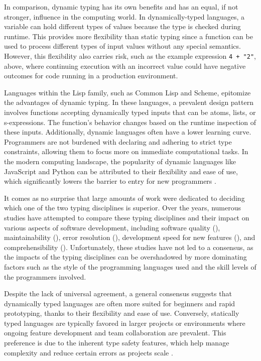 In comparison, dynamic typing has its own benefits and has an equal, if not stronger, influence in the computing world. In dynamically-typed languages, a variable can hold different types of values because the type is checked during runtime. This provides more flexibility than static typing since a function can be used to process different types of input values without any special semantics. However, this flexibility also carries risk, such as the example expression \texttt{4 + "2"}, above, where continuing execution with an incorrect value could have negative outcomes for code running in a production environment.

Languages within the Lisp family, such as Common Lisp and Scheme, epitomize the advantages of dynamic typing. In these languages, a prevalent design pattern involves functions accepting dynamically typed inputs that can be atoms, lists, or s-expressions. The function's behavior changes based on the runtime inspection of these inputs. Additionally, dynamic languages often have a lower learning curve. Programmers are not burdened with declaring and adhering to strict type constraints, allowing them to focus more on immediate computational tasks. In the modern computing landscape, the popularity of dynamic languages like JavaScript and Python can be attributed to their flexibility and ease of use, which significantly lowers the barrier to entry for new programmers \cite{Chatley2019-uq}.


It comes as no surprise that large amounts of work were dedicated to deciding which one of the two typing disciplines is superior. Over the years, numerous studies have attempted to compare these typing disciplines and their impact on various aspects of software development, including software quality (\cite{Ray2017-gq, Gao2017-xn}), maintainability (\cite{Kleinschmager2012-bg}), error resolution (\cite{Prechelt1998-pd}), development speed for new features (\cite{Prechelt2000-bf, Mayer2012-qc}), and comprehensibility (\cite{Endrikat2014-uz}). Unfortunately, these studies have not led to a consensus, as the impacts of the typing disciplines can be overshadowed by more dominating factors such as the style of the programming languages used and the skill levels of the programmers involved.

Despite the lack of universal agreement, a general consensus suggests that dynamically typed languages are often more suited for beginners and rapid prototyping, thanks to their flexibility and ease of use. Conversely, statically typed languages are typically favored in larger projects or environments where ongoing feature development and team collaboration are prevalent. This preference is due to the inherent type safety features, which help manage complexity and reduce certain errors as projects scale \cite{Chatley2019-uq}.


